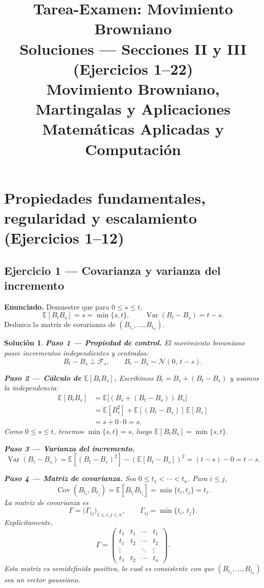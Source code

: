 \documentclass[12pt,letterpaper]{article}
\title{%
  \textbf{Tarea-Examen: Movimiento Browniano}\\[4pt]
  \large Soluciones — Secciones II y III (Ejercicios 1–22)\\
  \normalsize Movimiento Browniano, Martingalas y Aplicaciones\\
  Matemáticas Aplicadas y Computación
}
\author{}
\date{}
\theoremstyle{ejercicio}
\theoremstyle{solucion}
\newtheorem*{solucion}{Solución}
\newcommand{\E}{\mathbb{E}}
\newcommand{\Var}{\operatorname{Var}}
\newcommand{\Cov}{\operatorname{Cov}}
\newcommand{\F}{\mathcal{F}}
\begin{document}
\maketitle



\section{Propiedades fundamentales, regularidad y escalamiento (Ejercicios 1–12)}

\subsection*{Ejercicio 1 — Covarianza y varianza del incremento}

\begin{recuadro}
\textbf{Enunciado.} Demuestre que para $0\le s\le t$,
\[
  \E[B_t B_s]=s=\min\{s,t\},\qquad
  \Var(B_t-B_s)=t-s.
\]
Deduzca la matriz de covarianza de $(B_{t_1},\dots,B_{t_n})$.
\end{recuadro}

\begin{solucion}

\textbf{Paso 1 — Propiedad de control.}
El movimiento browniano posee incrementos independientes y centrados:
\[
  B_t - B_s \perp \F_s,\qquad
  B_t - B_s \sim \mathcal{N}(0,\,t-s).
\]

\textbf{Paso 2 — Cálculo de $\E[B_t B_s]$.}
Escribimos $B_t = B_s + (B_t - B_s)$ y usamos la independencia:
\begin{align*}
  \E[B_t B_s]
  &= \E\bigl[(B_s + (B_t-B_s))\,B_s\bigr]\\
  &= \E[B_s^2] + \E[(B_t-B_s)]\,\E[B_s]\\
  &= s + 0\cdot 0 = s.
\end{align*}
Como $0\le s\le t$, tenemos $\min\{s,t\}=s$, luego $\E[B_t B_s]=\min\{s,t\}$.

\textbf{Paso 3 — Varianza del incremento.}
\[
  \Var(B_t-B_s) = \E[(B_t-B_s)^2] - (\E[B_t-B_s])^2 = (t-s) - 0 = t-s.
\]

\textbf{Paso 4 — Matriz de covarianza.}
Sea $0\le t_1<\cdots<t_n$. Para $i\le j$,
\[
  \Cov(B_{t_i}, B_{t_j}) = \E[B_{t_i}B_{t_j}] = \min\{t_i,t_j\} = t_i.
\]
La matriz de covarianza es
\[
  \Gamma = \bigl(\Gamma_{ij}\bigr)_{1\le i,j\le n},
  \qquad
  \Gamma_{ij} = \min\{t_i,\,t_j\}.
\]
Explícitamente,
\[
  \Gamma =
  \begin{pmatrix}
    t_1 & t_1 & \cdots & t_1 \\
    t_1 & t_2 & \cdots & t_2 \\
    \vdots & & \ddots & \vdots \\
    t_1 & t_2 & \cdots & t_n
  \end{pmatrix}.
\]
Esta matriz es semidefinida positiva, lo cual es consistente con que
$(B_{t_1},\dots,B_{t_n})$ sea un vector gaussiano.
\end{solucion}
\end{document}
